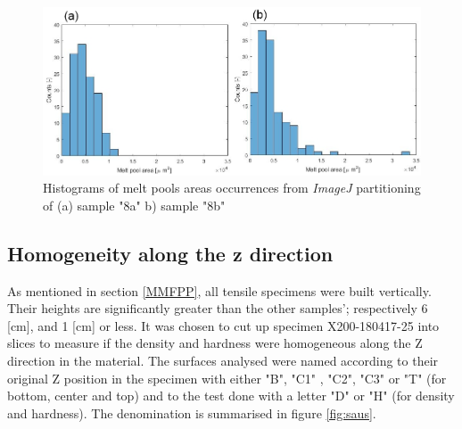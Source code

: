 \begin{figure}[ht]
\centering
\centerline{\includegraphics[scale=0.7]{Images/HistB1}}
\decoRule
\caption[Histograms of melt pools areas occurrences from \textit{ImageJ} partitioning of (a) sample "8a"  b) sample "8b"]{Histograms of melt pools areas occurrences from \textit{ImageJ} partitioning of (a) sample "8a"  b) sample "8b"}
\label{fig:HistB1}
\end{figure} 

 \begin{center}
\begin{table}[ht]
\noindent{}

\caption[Summary of the melt pools areas distributions for samples "8a" and "8b"]{Summary of the melt pools areas distributions for samples "8a" and "8b"}
\label{tab:tracMAB}
\end{table}
 \end{center}

\subsection{Homogeneity along the z direction}
As mentioned in section \ref{MMFPP}, all tensile specimens were built vertically. Their heights are significantly greater than the other samples'; respectively 6 [cm], and 1 [cm] or less. It was chosen to cut up specimen X200-180417-25 into slices to measure if the density and hardness were homogeneous along the Z direction in the material. The surfaces analysed were named according to their original Z position in the specimen with either "B", "C1" , "C2", "C3" or "T" (for bottom, center and top) and to the test done with a letter "D" or "H"  (for density and hardness). The denomination is summarised in figure \ref{fig:saus}.\\

